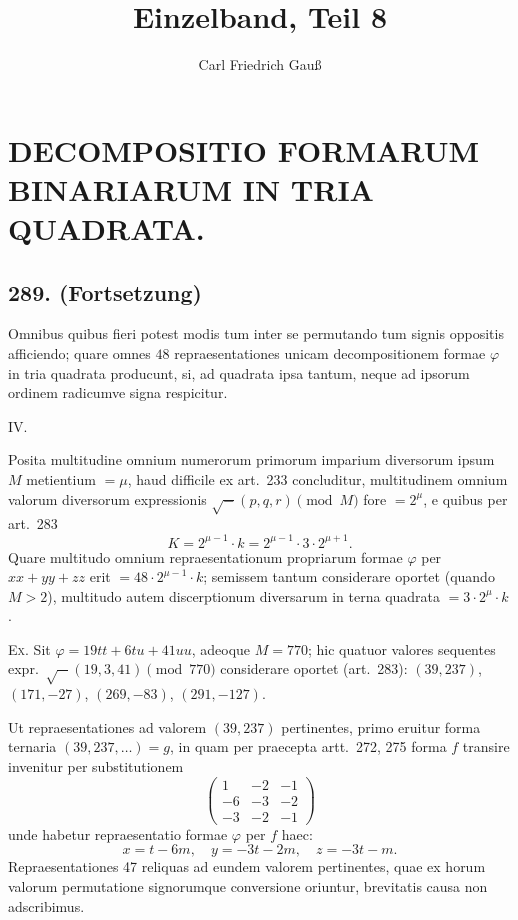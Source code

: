 \documentclass[12pt,a4paper]{article}
\title{Einzelband, Teil 8}
\author{Carl Friedrich Gau\ss}
\date{}
\theoremstyle{plain}
\theoremstyle{definition}
\theoremstyle{remark}
\begin{document}
\maketitle


\section*{DECOMPOSITIO FORMARUM BINARIARUM IN TRIA QUADRATA.}

\subsection*{289. (Fortsetzung)}

Omnibus quibus fieri potest modis tum inter se permutando tum signis oppositis
afficiendo; quare omnes $48$ repraesentationes unicam decompositionem formae
$\varphi$ in tria quadrata producunt, si, ad quadrata ipsa tantum, neque ad ipsorum
ordinem radicumve signa respicitur.

\textsc{IV.}

Posita multitudine omnium numerorum primorum imparium diversorum ipsum
$M$ metientium $= \mu$, haud difficile ex art.\@~233 concluditur, multitudinem
omnium valorum diversorum expressionis
$\sqrt{-}(p, q, r) \pmod{M}$
fore $= 2^{\mu}$, e quibus per art.\@~283
\[
K = 2^{\mu-1} \cdot k = 2^{\mu-1} \cdot 3 \cdot 2^{\mu+1}.
\]
Quare multitudo omnium repraesentationum propriarum formae $\varphi$ per
$xx + yy + zz$ erit $= 48 \cdot 2^{\mu-1} \cdot k$; semissem tantum considerare oportet
(quando $M > 2$), multitudo autem discerptionum diversarum in terna quadrata
$= 3 \cdot 2^{\mu} \cdot k$.

\textsc{Ex.} Sit $\varphi = 19tt + 6tu + 41uu$, adeoque $M = 770$; hic quatuor
valores sequentes expr.\@~$\sqrt{-}(19, 3, 41) \pmod{770}$ considerare oportet
(art.\@~283): $(39, 237)$, $(171, -27)$, $(269, -83)$, $(291, -127)$.

Ut repraesentationes ad valorem $(39, 237)$ pertinentes, primo eruitur forma
ternaria $(39, 237, \ldots) = g$, in quam per praecepta artt.\@~272, 275 forma
$f$ transire invenitur per substitutionem
\[
\begin{pmatrix}
1 & -2 & -1 \\
-6 & -3 & -2 \\
-3 & -2 & -1
\end{pmatrix}
\]
unde habetur repraesentatio formae $\varphi$ per $f$ haec:
\[
x = t - 6m, \quad y = -3t - 2m, \quad z = -3t - m.
\]
Repraesentationes 47 reliquas ad eundem valorem pertinentes, quae ex horum
valorum permutatione signorumque conversione oriuntur, brevitatis causa non
adscribimus.
\end{document}
